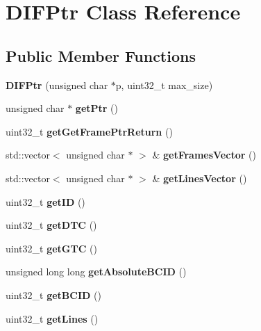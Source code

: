 \section{D\-I\-F\-Ptr Class Reference}
\label{classDIFPtr}
\subsection*{Public Member Functions}
\begin{DoxyCompactItemize}
\item 
{\bfseries D\-I\-F\-Ptr} (unsigned char $\ast$p, uint32\-\_\-t max\-\_\-size)\label{classDIFPtr_a1ec95322a11ec222592d69d947003067}

\item 
unsigned char $\ast$ {\bfseries get\-Ptr} ()\label{classDIFPtr_ad651990bff2ceda40ef902a881aeeec0}

\item 
uint32\-\_\-t {\bfseries get\-Get\-Frame\-Ptr\-Return} ()\label{classDIFPtr_a2c2a47771ad37cadbeea63c4dc987a74}

\item 
std\-::vector$<$ unsigned char $\ast$ $>$ \& {\bfseries get\-Frames\-Vector} ()\label{classDIFPtr_aa866203b824bc6127101ecc49f140deb}

\item 
std\-::vector$<$ unsigned char $\ast$ $>$ \& {\bfseries get\-Lines\-Vector} ()\label{classDIFPtr_ac3eabe969d84da39c5b3f1b02d6b2d50}

\item 
uint32\-\_\-t {\bfseries get\-I\-D} ()\label{classDIFPtr_a86a54006ce18b2edb5f94122cd46258f}

\item 
uint32\-\_\-t {\bfseries get\-D\-T\-C} ()\label{classDIFPtr_a185ff7c335f92dbbf419a20f12f23982}

\item 
uint32\-\_\-t {\bfseries get\-G\-T\-C} ()\label{classDIFPtr_ab907406b86a9208546ee80e2853752a9}

\item 
unsigned long long {\bfseries get\-Absolute\-B\-C\-I\-D} ()\label{classDIFPtr_a6bef56775da90f86385ce87f168a1fc7}

\item 
uint32\-\_\-t {\bfseries get\-B\-C\-I\-D} ()\label{classDIFPtr_a595f75322176a9a1fda707aefc5b5f9b}

\item 
uint32\-\_\-t {\bfseries get\-Lines} ()\label{classDIFPtr_af77cccc02ff318f5ef57c1cc59e63e3c}


\end{DoxyCompactItemize}
